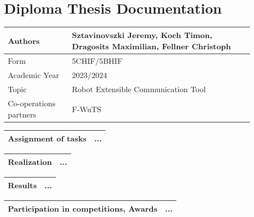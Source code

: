 \chapter{Diploma Thesis Documentation}
\begin{center}
    \begin{tabular}{| m{8cm} | m{8cm} |}
        \hline
        Authors & Sztavinovszki Jeremy, Koch Timon, Dragosits Maximilian, Fellner Christoph\\
        \hline
        Form & 5CHIF/5BHIF\\
        Academic Year & 2023/2024\\
        \hline
        Topic & Robot Extensible Communication Tool\\
        \hline
        Co-operations partners & F-WuTS\\
        \hline
    \end{tabular}
    
    \vspace{5mm}
    
    \begin{tabular}{| m{8cm} | m{8cm} |}
        \hline
        Assignment of tasks & ...\\ %
        \hline
    \end{tabular}
    
    \vspace{5mm}
    
    \begin{tabular}{| m{8cm} | m{8cm} |}
        \hline
        Realization & ...\\ %
        \hline
    \end{tabular}
    
    \vspace{5mm}
    
    \begin{tabular}{| m{8cm} | m{8cm} |}
        \hline
        Results & ...\\ %
        \hline
    \end{tabular}
    
    \vspace{5mm}
    
    \begin{tabular}{| m{8cm} | m{8cm} |}
        \hline
        Participation in competitions, Awards & ...\\ %
        \hline
    \end{tabular}
    

\end{center}
